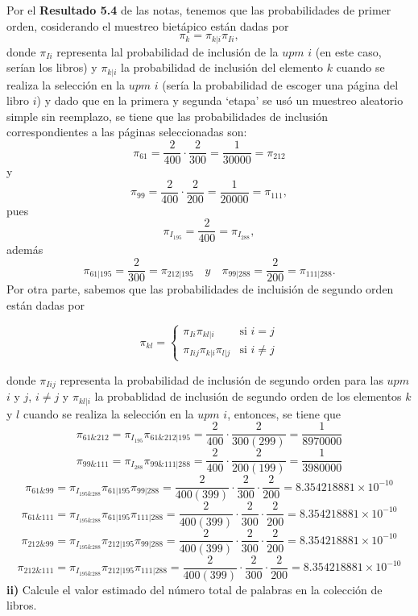 \documentclass[
]{article}
\begin{document}
Por el \textbf{Resultado 5.4} de las notas, tenemos que las
probabilidades de primer orden, cosiderando el muestreo bietápico están
dadas por \[\pi_k = \pi_{k|i}\pi_{Ii},\] donde \(\pi_{Ii}\) representa
lal probabilidad de inclusión de la \(upm\) \(i\) (en este caso, serían
los libros) y \(\pi_{k|i}\) la probabilidad de inclusión del elemento
\(k\) cuando se realiza la selección en la \(upm\) \(i\) (sería la
probabilidad de escoger una página del libro \(i\)) y dado que en la
primera y segunda `etapa' se usó un muestreo aleatorio simple sin
reemplazo, se tiene que las probabilidades de inclusión correspondientes
a las páginas seleccionadas son:
\[\pi_{61} = \frac{2}{400} \cdot \frac{2}{300} = \frac{1}{30000} = \pi_{212}\]
y
\[\pi_{99}  = \frac{2}{400} \cdot \frac{2}{200} = \frac{1}{20000} = \pi_{111},\]
pues \[\pi_{I_{195}} = \frac{2}{400} = \pi_{I_{288}},\] además
\[\pi_{61|195} = \frac{2}{300} = \pi_{212|195} \quad y \quad \pi_{99|288} = \frac{2}{200} = \pi_{111|288}.\]
Por otra parte, sabemos que las probabilidades de incluisión de segundo
orden están dadas por

\[ \pi_{kl}=\begin{cases} 
      \pi_{Ii}\pi_{kl|i} & \text{si } i=j \\
      \pi_{Iij}\pi_{k|i}\pi_{l|j} & \text{si } i\neq j  
   \end{cases}
\]

donde \(\pi_{Iij}\) representa la probabilidad de inclusión de segundo
orden para las \(upm\) \(i\) y \(j\), \(i\neq j\) y \(\pi_{kl|i}\) la
probablidad de inclusión de segundo orden de los elementos \(k\) y \(l\)
cuando se realiza la selección en la \(upm\) \(i\), entonces, se tiene
que
\[\pi_{61 \& 212} = \pi_{I_{195}}\pi_{61\&212 | 195} = \frac{2}{400}\cdot\frac{2}{300(299)} = \frac{1}{8970000}\]
\[\pi_{99\&111} = \pi_{I_{288}}\pi_{99\&111 | 288} = \frac{2}{400}\cdot \frac{2}{200(199)}= \frac{1}{3980000} \]
\[\pi_{61 \& 99} = \pi_{I_{195 \&288}}\pi_{61|195}\pi_{99|288} = \frac{2}{400(399)}\cdot\frac{2}{300}\cdot\frac{2}{200} = 8.354218881\times 10^{-10}\]
\[\pi_{61 \& 111} = \pi_{I_{195 \&288}}\pi_{61|195}\pi_{111|288} = \frac{2}{400(399)}\cdot\frac{2}{300}\cdot\frac{2}{200} = 8.354218881\times 10^{-10}\]
\[\pi_{212\&99} = \pi_{I_{195 \&288}} \pi_{212|195}\pi_{99|288} = \frac{2}{400(399)}\cdot\frac{2}{300} \cdot\frac{2}{200} = 8.354218881\times 10^{-10} \]
\[\pi_{212\&111} = \pi_{I_{195 \&288}} \pi_{212|195}\pi_{111|288} = \frac{2}{400(399)}\cdot\frac{2}{300}\cdot\frac{2}{200} = 8.354218881\times 10^{-10}\]
\textbf{ii)} Calcule el valor estimado del número total de palabras en
la colección de libros.
\end{document}
